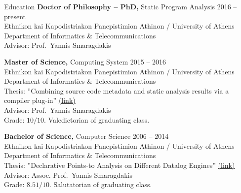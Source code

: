 \documentclass{resume}
\begin{document}
\newcommand{\mytilde}{\raise.17ex\hbox{$\scriptstyle\mathtt{\sim}$}}
\newcommand{\indentitem}{\setlength\itemindent{25pt}}


\begin{rSection}{Education}
  {\bf Doctor of Philosophy -- PhD,} Static Program Analysis \hfill {2016 -- present } \\
  Ethnikon kai Kapodistriakon Panepistimion Athinon / University of Athens \\
  Department of Informatics \& Telecommunications \\
  Advisor: Prof.~Yannis Smaragdakis

  {\bf Master of Science,} Computing System \hfill {2015 -- 2016 } \\
  Ethnikon kai Kapodistriakon Panepistimion Athinon / University of Athens \\
  Department of Informatics \& Telecommunications \\
  Thesis: ''Combining source code metadata and static analysis results via a compiler plug-in'' \href{http://cgi.di.uoa.gr/~smaragd/theses/antoniadis2.pdf}{ (link)} \\
  Advisor: Prof.~Yannis Smaragdakis \\
  Grade: $10 / 10$. Valedictorian of graduating class.

  {\bf Bachelor of Science,}  Computer Science \hfill {2006 -- 2014}  \\
  Ethnikon kai Kapodistriakon Panepistimion Athinon / University of Athens \\
  Department of Informatics \& Telecommunications \\
  Thesis: ''Declarative Points-to Analysis on Different Datalog Engines'' \href{http://cgi.di.uoa.gr/~smaragd/theses/antoniadis.pdf}{ (link)} \\
  Advisor: Assoc. Prof.~Yannis Smaragdakis \\
  Grade: $8.51 / 10$. Salutatorian of graduating class.

\end{rSection}

\end{document}
